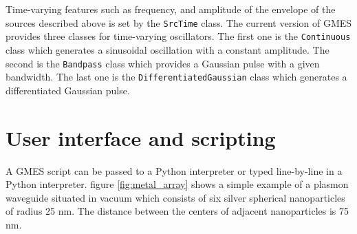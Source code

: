 
Time-varying features such as frequency, and amplitude of the envelope of the sources described above is set by the \texttt{SrcTime} class. The current version of GMES provides three classes for time-varying oscillators. The first one is the \texttt{Continuous} class which generates a sinusoidal oscillation with a constant amplitude. The second is the \texttt{Bandpass} class which provides a Gaussian pulse with a given bandwidth. The last one is the \texttt{DifferentiatedGaussian} class which generates a differentiated Gaussian pulse.

\section{User interface and scripting}
\label{sec:interface}
A GMES script can be passed to a Python interpreter or typed line-by-line in a Python interpreter. figure \ref{fig:metal_array} shows a simple example of a plasmon waveguide situated in vacuum which consists of six silver spherical nanoparticles of radius 25 nm. The distance between the centers of adjacent nanoparticles is 75 nm.


